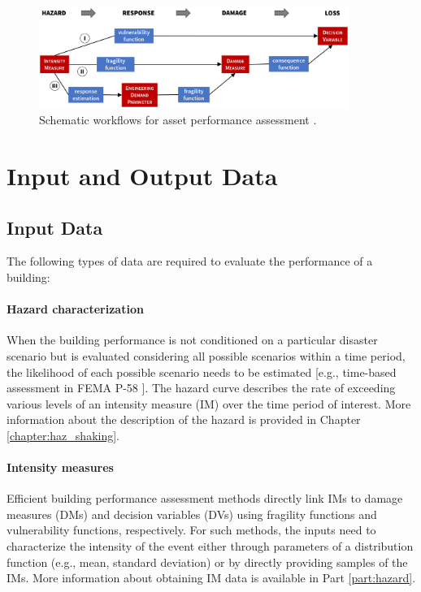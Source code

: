 \begin{figure}[htb]
    \centering
    \includegraphics[width=0.9\textwidth, angle = 0]{Figures/PBEapproaches.pdf}
    \caption{Schematic workflows for asset performance assessment \citep{deierlein2020cloud}.}
    \label{fig:perf_PBEapproaches}
\end{figure}
 
\section{Input and Output Data}
\label{sec:perf_bldg_io}

\subsection{Input Data}

The following types of data are required to evaluate the performance of a building:

\paragraph{Hazard characterization} When the building performance is not conditioned on a particular disaster scenario but is evaluated considering all possible scenarios within a time period, the likelihood of each possible scenario needs to be estimated [e.g., time-based assessment in FEMA P-58 \citep{atc2018p-58-1}]. The hazard curve describes the rate of exceeding various levels of an intensity measure (IM) over the time period of interest. More information about the description of the hazard is provided in Chapter \ref{chapter:haz_shaking}.

\paragraph{Intensity measures} Efficient building performance assessment methods directly link IMs to damage measures (DMs) and decision variables (DVs) using fragility functions and vulnerability functions, respectively. For such methods, the inputs need to characterize the intensity of the event either through parameters of a distribution function (e.g., mean, standard deviation) or by directly providing samples of the IMs. More information about obtaining IM data is available in Part \ref{part:hazard}.

